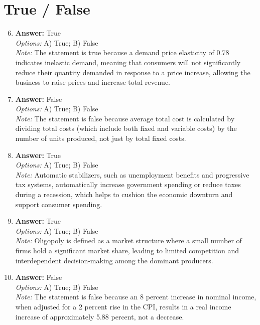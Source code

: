 \documentclass[12pt]{article}
\begin{document}
\section*{True / False}
\begin{enumerate}[label=\arabic*.]
\setcounter{enumi}{5}
\item \textbf{Answer:} True
\\ \textit{Options:} A) True; B) False
\\ \textit{Note:} The statement is true because a demand price elasticity of 0.78 indicates inelastic demand, meaning that consumers will not significantly reduce their quantity demanded in response to a price increase, allowing the business to raise prices and increase total revenue.
\item \textbf{Answer:} False
\\ \textit{Options:} A) True; B) False
\\ \textit{Note:} The statement is false because average total cost is calculated by dividing total costs (which include both fixed and variable costs) by the number of units produced, not just by total fixed costs.
\item \textbf{Answer:} True
\\ \textit{Options:} A) True; B) False
\\ \textit{Note:} Automatic stabilizers, such as unemployment benefits and progressive tax systems, automatically increase government spending or reduce taxes during a recession, which helps to cushion the economic downturn and support consumer spending.
\item \textbf{Answer:} True
\\ \textit{Options:} A) True; B) False
\\ \textit{Note:} Oligopoly is defined as a market structure where a small number of firms hold a significant market share, leading to limited competition and interdependent decision-making among the dominant producers.
\item \textbf{Answer:} False
\\ \textit{Options:} A) True; B) False
\\ \textit{Note:} The statement is false because an 8 percent increase in nominal income, when adjusted for a 2 percent rise in the CPI, results in a real income increase of approximately 5.88 percent, not a decrease.
\end{enumerate}
\end{document}
